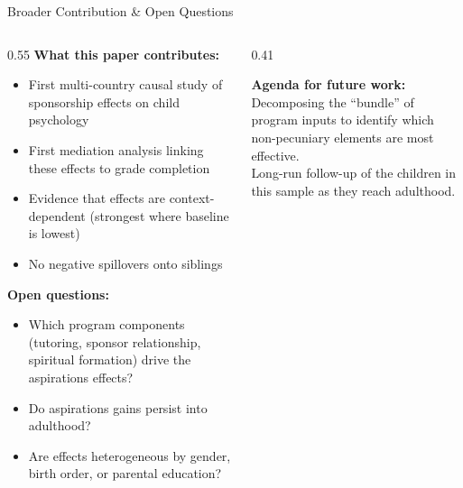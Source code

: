 \documentclass[aspectratio=169, 10pt]{beamer}
\begin{document}
\begin{frame}{Broader Contribution \& Open Questions}
  \begin{columns}
    \begin{column}{0.55\textwidth}
      \textbf{What this paper contributes:}
      \begin{itemize}
        \item First multi-country causal study of sponsorship effects on child psychology
        \item First mediation analysis linking these effects to grade completion
        \item Evidence that effects are context-dependent (strongest where baseline is lowest)
        \item No negative spillovers onto siblings
      \end{itemize}
      \vspace{0.5em}
      \textbf{Open questions:}
      \begin{itemize}
        \item Which program components (tutoring, sponsor relationship, spiritual formation) drive the aspirations effects?
        \item Do aspirations gains persist into adulthood?
        \item Are effects heterogeneous by gender, birth order, or parental education?
      \end{itemize}
    \end{column}
    \begin{column}{0.41\textwidth}
      \begin{keybox}
        \textbf{Agenda for future work:}\\[0.4em]
        Decomposing the ``bundle'' of program inputs to identify which non-pecuniary elements are most effective.\\[0.5em]
        Long-run follow-up of the children in this sample as they reach adulthood.
      \end{keybox}
    \end{column}
  \end{columns}
\end{frame}
\end{document}
